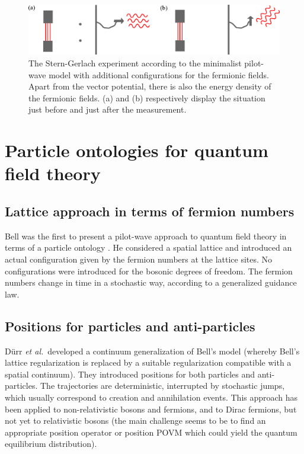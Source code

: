 \documentclass[11pt]{article}
\begin{document}
\begin{figure}
\begin{center}
\includegraphics[width=\textwidth]{minimalistplus.eps}
\end{center}
\caption{\label{minimalistplus}The Stern-Gerlach experiment according to the minimalist pilot-wave model with additional configurations for the fermionic fields. Apart from the vector potential, there is also the energy density of the fermionic fields. (a) and (b) respectively display the situation just before and just after the measurement.}
\end{figure}


\section{Particle ontologies for quantum field theory}\label{particles}
\subsection{Lattice approach in terms of fermion numbers}
Bell was the first to present a pilot-wave approach to quantum field theory in terms of a particle ontology \cite{bell87b}. He considered a spatial lattice and introduced an actual configuration given by the fermion numbers at the lattice sites. No configurations were introduced for the bosonic degrees of freedom. The fermion numbers change in time in a stochastic way, according to a generalized guidance law.  

\subsection{Positions for particles and anti-particles}
D\"urr {\em et al.}\  developed a continuum generalization of Bell's model \cite{durr02,durr031,durr032,durr04} (whereby Bell's lattice regularization is replaced by a suitable regularization compatible with a spatial continuum). They introduced positions for both particles and anti-particles. The trajectories are deterministic, interrupted by stochastic jumps, which usually correspond to creation and annihilation events. This approach has been applied to non-relativistic bosons and fermions, and to Dirac fermions, but not yet to relativistic bosons (the main challenge seems to be to find an appropriate position operator or position POVM which could yield the quantum equilibrium distribution).  
\end{document}
